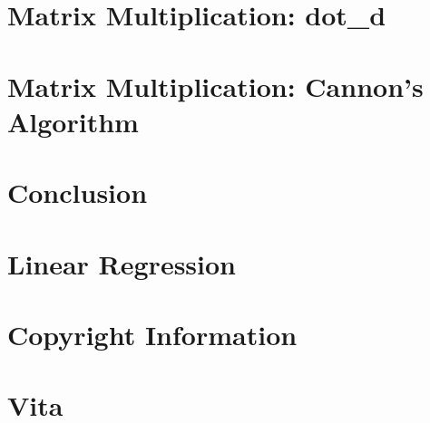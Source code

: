 \documentclass[12pt,letterpaper]{lsuetd}
\begin{document}
\chapter{Matrix Multiplication: dot\_d}
\doublespacing

\pagebreak
\singlespacing
\chapter{Matrix Multiplication: Cannon's Algorithm}
\doublespacing

\pagebreak
\singlespacing
\chapter{Conclusion}
\doublespacing

\pagebreak
\singlespacing

%
\appendix
\chapter{Linear Regression}
\vspace{0.5em}

\pagebreak
\chapter{Copyright Information}
\vspace{0.5em}

\pagebreak
%
%


\pagebreak
\chapter*{Vita}
\doublespacing
\vspace{0.2em}

\end{document}
